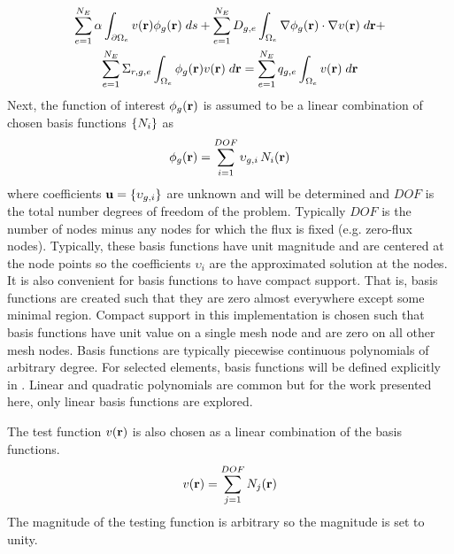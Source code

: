     \begin{multline}
      \label{eq:element_boundary}
      \sum_{e=1}^{N_E} \alpha \int_{\partial \Omega_e} v(\mathbf{r}) 
        \phi_g(\mathbf{r}) \;ds + \sum_{e=1}^{N_E} D_{g,e}
        \int_{\Omega_e} \mathbf{\nabla} \phi_g(\mathbf{r}) \cdot \mathbf{\nabla} v(\mathbf{r}) \; d\mathbf{r} + \\
        \sum_{e=1}^{N_E} \Sigma_{r,g,e} \int_{\Omega_e} \phi_g(\mathbf{r}) v(\mathbf{r}) 
        \; d\mathbf{r} =
        \sum_{e=1}^{N_E} q_{g,e} \int_{\Omega_e} v(\mathbf{r}) \; d\mathbf{r}
    \end{multline}
    Next, the function of interest $\phi_g(\mathbf{r})$ is assumed to be a linear 
    combination of chosen basis functions $\{N_i\}$ as
    \begin{equation} 
      \label{eq:linear_combination}
      \phi_g(\mathbf{r}) = \sum_{i=1}^{DOF} \upsilon_{g,i} \, N_i(\mathbf{r})
    \end{equation}
    where coefficients $\mathbf{u} = \{\upsilon_{g,i}\}$ are unknown and will be 
    determined and $DOF$ is the total number degrees of freedom of the problem. 
    Typically $DOF$ is the number of nodes minus any nodes for which the flux is 
    fixed (e.g. zero-flux nodes).  Typically, these basis functions have unit 
    magnitude and are centered at the node  points so the coefficients 
    $\upsilon_i$ are the approximated solution at the nodes. It is also 
    convenient for basis functions to have compact support. That is, basis 
    functions are created such that they are zero almost everywhere except some
    minimal region. Compact support in this implementation is chosen such that
    basis functions have unit value on a single mesh node and are zero on all
    other mesh nodes. Basis functions are typically piecewise continuous 
    polynomials of arbitrary degree. For selected elements, basis functions will
    be defined explicitly in .  Linear and quadratic
    polynomials are common but for the work presented here, only linear
    basis functions are explored.

    The test function $v(\mathbf{r})$ is also chosen as a linear combination of the 
    basis functions.
    \begin{equation} 
      \label{eq:linear_superposition}
      v(\mathbf{r}) = \sum_{j=1}^{DOF} N_j(\mathbf{r})
    \end{equation}
    The magnitude of the testing function is arbitrary so the magnitude is set
    to unity.
    
